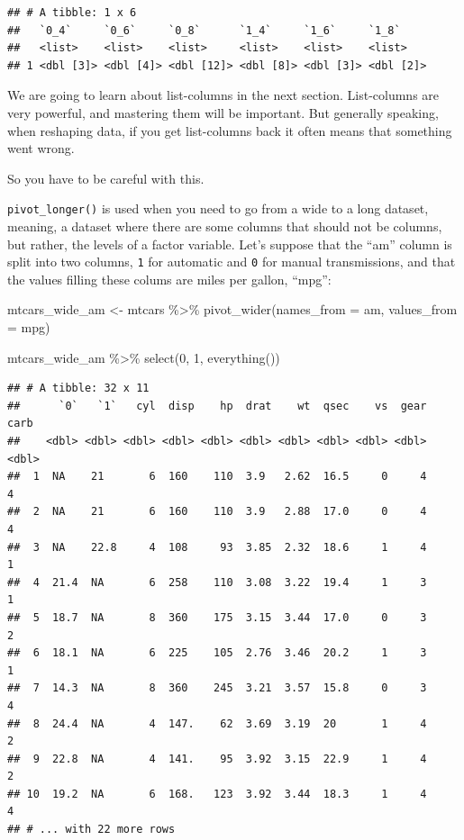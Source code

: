 \documentclass[
]{article}
\newenvironment{Shaded}{\begin{snugshade}}{\end{snugshade}}
\newcommand{\AttributeTok}[1]{\textcolor[rgb]{0.77,0.63,0.00}{#1}}
\newcommand{\FunctionTok}[1]{\textcolor[rgb]{0.00,0.00,0.00}{#1}}
\newcommand{\NormalTok}[1]{#1}
\newcommand{\OtherTok}[1]{\textcolor[rgb]{0.56,0.35,0.01}{#1}}
\newcommand{\SpecialCharTok}[1]{\textcolor[rgb]{0.00,0.00,0.00}{#1}}
\newcommand{\StringTok}[1]{\textcolor[rgb]{0.31,0.60,0.02}{#1}}
\begin{document}
\begin{verbatim}
## # A tibble: 1 x 6
##   `0_4`     `0_6`     `0_8`      `1_4`     `1_6`     `1_8`    
##   <list>    <list>    <list>     <list>    <list>    <list>   
## 1 <dbl [3]> <dbl [4]> <dbl [12]> <dbl [8]> <dbl [3]> <dbl [2]>
\end{verbatim}

We are going to learn about list-columns in the next section. List-columns are very powerful, and
mastering them will be important. But generally speaking, when reshaping data, if you get list-columns
back it often means that something went wrong.

So you have to be careful with this.

\texttt{pivot\_longer()} is used when you need to go from a wide to a long dataset, meaning, a dataset
where there are some columns that should not be columns, but rather, the levels of a factor
variable. Let's suppose that the ``am'' column is split into two columns, \texttt{1} for automatic and \texttt{0}
for manual transmissions, and that the values filling these colums are miles per gallon, ``mpg'':

\begin{Shaded}
\begin{Highlighting}[]
\NormalTok{mtcars\_wide\_am }\OtherTok{\textless{}{-}}\NormalTok{ mtcars }\SpecialCharTok{\%\textgreater{}\%} 
  \FunctionTok{pivot\_wider}\NormalTok{(}\AttributeTok{names\_from =}\NormalTok{ am, }\AttributeTok{values\_from =}\NormalTok{ mpg)}

\NormalTok{mtcars\_wide\_am }\SpecialCharTok{\%\textgreater{}\%} 
  \FunctionTok{select}\NormalTok{(}\StringTok{\textasciigrave{}}\AttributeTok{0}\StringTok{\textasciigrave{}}\NormalTok{, }\StringTok{\textasciigrave{}}\AttributeTok{1}\StringTok{\textasciigrave{}}\NormalTok{, }\FunctionTok{everything}\NormalTok{())}
\end{Highlighting}
\end{Shaded}

\begin{verbatim}
## # A tibble: 32 x 11
##      `0`   `1`   cyl  disp    hp  drat    wt  qsec    vs  gear  carb
##    <dbl> <dbl> <dbl> <dbl> <dbl> <dbl> <dbl> <dbl> <dbl> <dbl> <dbl>
##  1  NA    21       6  160    110  3.9   2.62  16.5     0     4     4
##  2  NA    21       6  160    110  3.9   2.88  17.0     0     4     4
##  3  NA    22.8     4  108     93  3.85  2.32  18.6     1     4     1
##  4  21.4  NA       6  258    110  3.08  3.22  19.4     1     3     1
##  5  18.7  NA       8  360    175  3.15  3.44  17.0     0     3     2
##  6  18.1  NA       6  225    105  2.76  3.46  20.2     1     3     1
##  7  14.3  NA       8  360    245  3.21  3.57  15.8     0     3     4
##  8  24.4  NA       4  147.    62  3.69  3.19  20       1     4     2
##  9  22.8  NA       4  141.    95  3.92  3.15  22.9     1     4     2
## 10  19.2  NA       6  168.   123  3.92  3.44  18.3     1     4     4
## # ... with 22 more rows
\end{verbatim}
\end{document}
